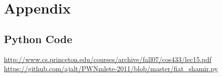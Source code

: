 \documentclass[10pt]{article}
\begin{document}
\newpage
\section{Appendix}
    \subsection{Python Code}
    
    
    
    
    
    
    
    

\newpage
\begin{thebibliography}{9}
     \url{http://www.cs.princeton.edu/courses/archive/fall07/cos433/lec15.pdf}
     \url{https://github.com/ajalt/PWNmlete-2011/blob/master/fiat_shamir.py}
\end{thebibliography}
\end{document}

